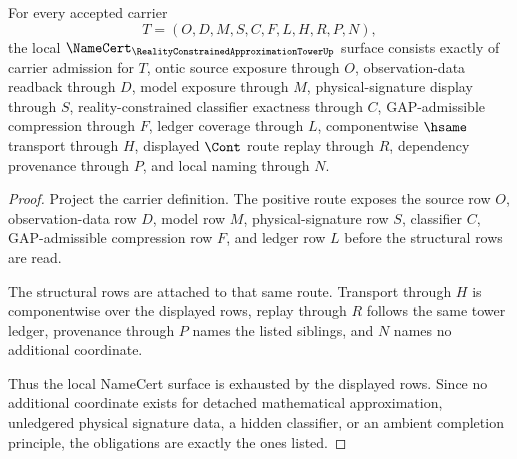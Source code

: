 \begin{theorem}
\label{thm:reality-constrained-approximation-tower-namecert-obligations}
For every accepted \RealityConstrainedApproximationTowerUp carrier
$$
T=(O,D,M,S,C,F,L,H,R,P,N),
$$
the local $\NameCert_{\RealityConstrainedApproximationTowerUp}$ surface consists exactly of carrier admission for $T$, ontic source exposure through $O$, observation-data readback through $D$, model exposure through $M$, physical-signature display through $S$, reality-constrained classifier exactness through $C$, GAP-admissible compression through $F$, ledger coverage through $L$, componentwise $\hsame$ transport through $H$, displayed $\Cont$ route replay through $R$, dependency provenance through $P$, and local naming through $N$.
\end{theorem}
\begin{proof}
Project the carrier definition. The positive route exposes the source row $O$, observation-data row $D$, model row $M$, physical-signature row $S$, classifier $C$, GAP-admissible compression row $F$, and ledger row $L$ before the structural rows are read.

The structural rows are attached to that same route. Transport through $H$ is componentwise over the displayed rows, replay through $R$ follows the same tower ledger, provenance through $P$ names the listed siblings, and $N$ names no additional coordinate.

Thus the local NameCert surface is exhausted by the displayed rows. Since no additional coordinate exists for detached mathematical approximation, unledgered physical signature data, a hidden classifier, or an ambient completion principle, the obligations are exactly the ones listed.
\end{proof}

